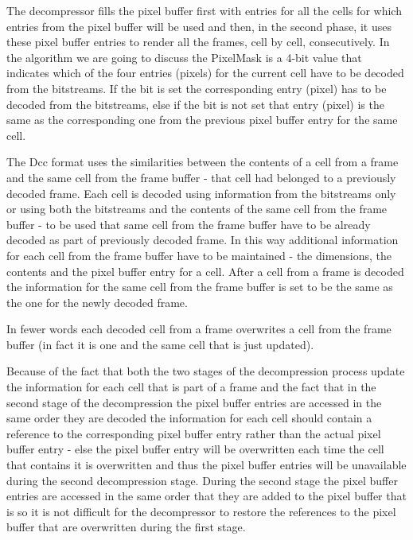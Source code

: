 The decompressor fills the pixel buffer first with entries for all the cells for 
which entries from the pixel buffer will be used and then, in the second phase, 
it uses these pixel buffer entries to render all the frames, cell by cell, 
consecutively. In the algorithm we are going to discuss the PixelMask is a 4-bit 
value that indicates which of the four entries (pixels) for the current cell 
have to be decoded from the bitstreams. If the bit is set the corresponding 
entry (pixel) has to be decoded from the bitstreams, else if the bit is not set 
that entry (pixel) is the same as the corresponding one from the previous pixel 
buffer entry for the same cell. 

The Dcc format uses the similarities between the 
contents of a cell from a frame and the same cell from the frame buffer - that 
cell had belonged to a previously decoded frame. Each cell is decoded using 
information from the bitstreams only or using both the bitstreams and the 
contents of the same cell from the frame buffer - to be used that same cell from 
the frame buffer have to be already decoded as part of previously decoded frame. 
In this way additional information for each cell from the frame buffer have to 
be maintained - the dimensions, the contents and the pixel buffer entry for a 
cell. After a cell from a frame is decoded the information for the same cell from 
the frame buffer is set to be the same as the one for the newly decoded frame. 

In fewer words each decoded cell from a frame overwrites a cell from the frame 
buffer (in fact it is one and the same cell that is just updated).

Because of the fact that both the two stages of the decompression process update 
the information for each cell that is part of a frame and the fact that in the 
second stage of the decompression the pixel buffer entries are accessed in the 
same order they are decoded the information for each cell should contain a 
reference to the corresponding pixel buffer entry rather than the actual pixel 
buffer entry - else the pixel buffer entry will be overwritten each time the 
cell that contains it is overwritten and thus the pixel buffer entries will be 
unavailable during the second decompression stage. During the second stage the 
pixel buffer entries are accessed in the same order that they are added to the 
pixel buffer that is so it is not difficult for the decompressor to restore the 
references to the pixel buffer that are overwritten during the first stage.


